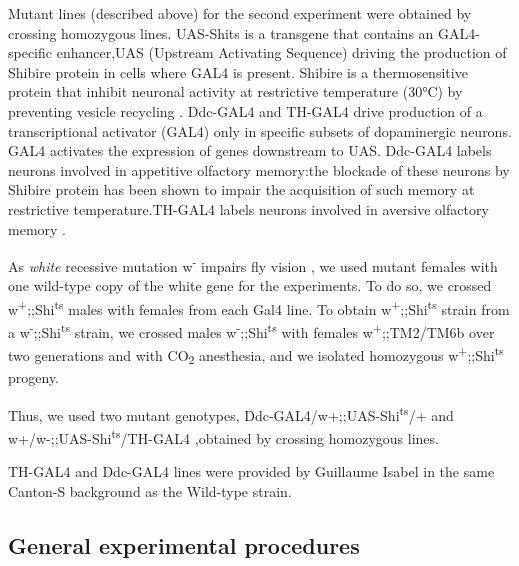 \documentclass[a4paper, 12pt]{article}
\begin{document}
	
	Mutant lines (described above) for the second experiment were obtained by crossing homozygous lines.
	UAS-Shits is a transgene that contains an GAL4-specific enhancer,UAS (Upstream Activating Sequence) driving the production of Shibire protein in cells where GAL4 is present. Shibire is a thermosensitive protein that inhibit neuronal activity at restrictive temperature (30°C) by preventing vesicle recycling \parencite{kitamoto_conditional_2001}. Ddc-GAL4 and TH-GAL4 drive production of a transcriptional activator (GAL4) only in specific subsets of dopaminergic neurons. GAL4 activates the expression of genes downstream to UAS. Ddc-GAL4 labels neurons involved in appetitive olfactory memory:the blockade of these neurons by Shibire protein has been shown to impair the acquisition of such memory at restrictive temperature\parencite{kosaka_reversible_1983}.TH-GAL4 labels neurons involved in aversive olfactory memory \parencite{liu_subset_2012}.
	
	As \textit{white} recessive mutation w\textsuperscript{-} impairs fly vision \parencite{gotz_optomotorische_1964}, we used mutant females with one wild-type copy of the white gene for the experiments. To do so, we crossed w\textsuperscript{+};;Shi\textsuperscript{ts} males with females from each Gal4 line. To obtain w\textsuperscript{+};;Shi\textsuperscript{ts} strain from a w\textsuperscript{-};;Shi\textsuperscript{ts} strain, we crossed males w\textsuperscript{-};;Shi\textsuperscript{ts} with females w\textsuperscript{+};;TM2/TM6b over two generations and with CO\textsubscript{2} anesthesia, and we isolated homozygous w\textsuperscript{+};;Shi\textsuperscript{ts} progeny.
	
	Thus, we used two mutant genotypes, Ddc-GAL4/w+;;UAS-Shi\textsuperscript{ts}/+ and w+/w-;;UAS-Shi\textsuperscript{ts}/TH-GAL4 ,obtained by crossing homozygous lines. 
	
	TH-GAL4 and Ddc-GAL4 lines were provided by Guillaume Isabel in the same Canton-S background as the Wild-type strain.


	\subsection{General experimental procedures}
	
\end{document}
